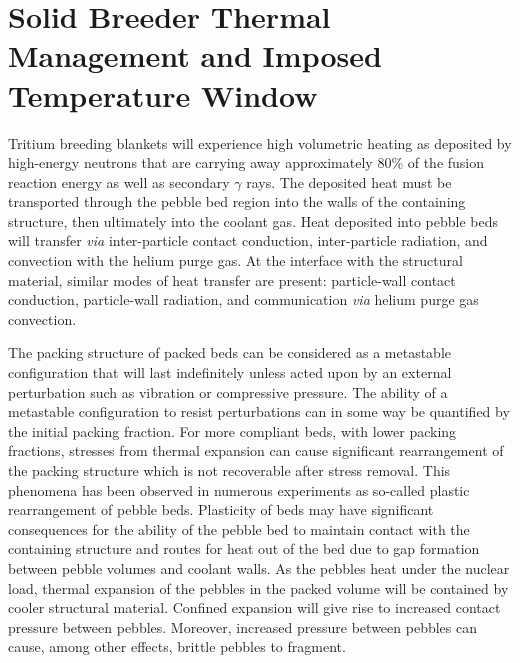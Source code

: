 \documentclass[11pt]{report} %
\begin{document}
\section{Solid Breeder Thermal Management and Imposed Temperature Window}

Tritium breeding blankets will experience high volumetric heating as deposited by high-energy neutrons that are carrying away approximately 80\% of the fusion reaction energy as well as secondary $\gamma$ rays. The deposited heat must be transported through the pebble bed region into the walls of the containing structure, then ultimately into the coolant gas. Heat deposited into pebble beds will transfer \textit{via} inter-particle contact conduction, inter-particle radiation, and convection with the helium purge gas. At the interface with the structural material, similar modes of heat transfer are present: particle-wall contact conduction, particle-wall radiation, and communication \textit{via} helium purge gas convection. 

The packing structure of packed beds can be considered as a metastable configuration that will last indefinitely unless acted upon by an external perturbation such as vibration or compressive pressure.\cite{Jaeger1996} The ability of a metastable configuration to resist perturbations can in some way be quantified by the initial packing fraction. For more compliant beds, with lower packing fractions, stresses from thermal expansion can cause significant rearrangement of the packing structure which is not recoverable after stress removal. This phenomena has been observed in numerous experiments as so-called plastic rearrangement of pebble beds.\cite{Reimann:2002kl,Reimann:2000tw,Zhang2015} Plasticity of beds may have significant consequences for the ability of the pebble bed to maintain contact with the containing structure and routes for heat out of the bed due to gap formation between pebble volumes and coolant walls. As the pebbles heat under the nuclear load, thermal expansion of the pebbles in the packed volume will be contained by cooler structural material. Confined expansion will give rise to increased contact pressure between pebbles. Moreover, increased pressure between pebbles can cause, among other effects, brittle pebbles to fragment.
\end{document}
